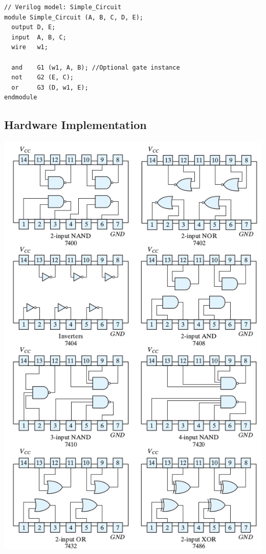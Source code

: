 \begin{lstlisting}
// Verilog model: Simple_Circuit
module Simple_Circuit (A, B, C, D, E);
  output D, E;
  input  A, B, C;
  wire	 w1;
  
  and 	 G1 (w1, A, B); //Optional gate instance
  not	 G2 (E, C);
  or	 G3 (D, w1, E);
endmodule
\end{lstlisting}

\subsection*{Hardware Implementation}\label{sec:hardw-impl}

\clearpage
{}\label{sec:hardw-impl-5}
\hfil\includegraphics[height=\textheight]{../Graphics/Ch11Art513.png}\hfil

